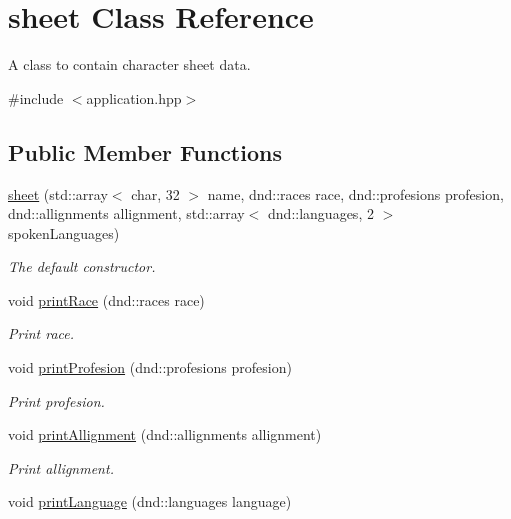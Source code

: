 \hypertarget{classsheet}{}\section{sheet Class Reference}
\label{classsheet}


A class to contain character sheet data.  




{\ttfamily \#include $<$application.\+hpp$>$}

\subsection*{Public Member Functions}
\begin{DoxyCompactItemize}
\item 
\hyperlink{classsheet_afae0c2b257d19526ca0482e3e246ec30}{sheet} (std\+::array$<$ char, 32 $>$ name, dnd\+::races race, dnd\+::profesions profesion, dnd\+::allignments allignment, std\+::array$<$ dnd\+::languages, 2 $>$ spoken\+Languages)
\begin{DoxyCompactList}\small\item\em The default constructor. \end{DoxyCompactList}\item 
void \hyperlink{classsheet_a84f442ba9c1fe19f04bc1e8eed30c8c4}{print\+Race} (dnd\+::races race)
\begin{DoxyCompactList}\small\item\em Print race. \end{DoxyCompactList}\item 
void \hyperlink{classsheet_aeaee0f027d25a9076ebabad9bcb51a40}{print\+Profesion} (dnd\+::profesions profesion)
\begin{DoxyCompactList}\small\item\em Print profesion. \end{DoxyCompactList}\item 
\mbox{\label{classsheet_aa0e0036c9943ca69c4e05e0a1c03b1e7}} 
void \hyperlink{classsheet_aa0e0036c9943ca69c4e05e0a1c03b1e7}{print\+Allignment} (dnd\+::allignments allignment)
\begin{DoxyCompactList}\small\item\em Print allignment. \end{DoxyCompactList}\item 
\mbox{\label{classsheet_a52a971ba4d8131fec3c5d13fd27cf692}} 
void \hyperlink{classsheet_a52a971ba4d8131fec3c5d13fd27cf692}{print\+Language} (dnd\+::languages language)

\end{DoxyCompactItemize}
